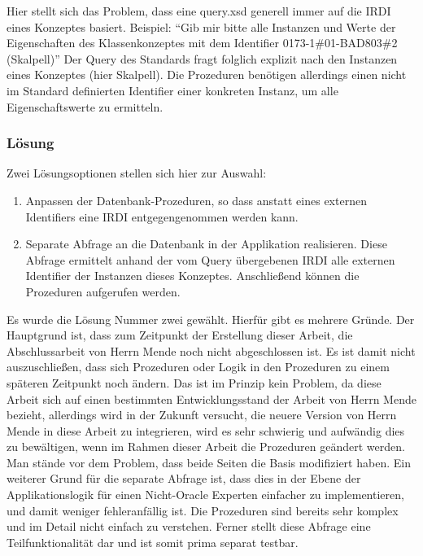Hier stellt sich das Problem, dass eine query.xsd generell immer auf die IRDI eines Konzeptes basiert. 
Beispiel: \enquote{Gib mir bitte alle Instanzen und Werte der Eigenschaften des Klassenkonzeptes mit dem Identifier 0173-1\#01-BAD803\#2 (Skalpell)}
Der Query des Standards fragt folglich explizit nach den Instanzen eines Konzeptes (hier Skalpell). Die Prozeduren benötigen allerdings einen nicht im Standard definierten Identifier einer konkreten Instanz, um alle Eigenschaftswerte zu ermitteln. 

\subsubsection{Lösung}

Zwei Lösungsoptionen stellen sich hier zur Auswahl:
\begin{enumerate}
\item Anpassen der Datenbank-Prozeduren, so dass anstatt eines externen Identifiers eine IRDI entgegengenommen werden kann.
\item Separate Abfrage an die Datenbank in der Applikation realisieren. Diese Abfrage ermittelt anhand der vom Query übergebenen IRDI alle externen Identifier der Instanzen dieses Konzeptes. Anschließend können die Prozeduren aufgerufen werden.   
\end{enumerate}

Es wurde die Lösung Nummer zwei gewählt. Hierfür gibt es mehrere Gründe. Der Hauptgrund ist, dass zum Zeitpunkt der Erstellung dieser Arbeit, die Abschlussarbeit von Herrn Mende noch nicht abgeschlossen ist. Es ist damit nicht auszuschließen, dass sich Prozeduren oder Logik in den Prozeduren zu einem späteren Zeitpunkt noch ändern. Das ist im Prinzip kein Problem, da diese Arbeit sich auf einen bestimmten Entwicklungsstand der Arbeit von Herrn Mende bezieht, allerdings wird in der Zukunft versucht, die neuere Version von Herrn Mende in diese Arbeit zu integrieren, wird es sehr schwierig und aufwändig dies zu bewältigen, wenn im Rahmen dieser Arbeit die Prozeduren geändert werden. Man stände vor dem Problem, dass beide Seiten die Basis modifiziert haben. 
Ein weiterer Grund für die separate Abfrage ist, dass dies in der Ebene der Applikationslogik für einen Nicht-Oracle Experten einfacher zu implementieren, und damit weniger fehleranfällig ist. Die Prozeduren sind bereits sehr komplex und im Detail nicht einfach zu verstehen. 
Ferner stellt diese Abfrage eine Teilfunktionalität dar und ist somit prima separat testbar.  

